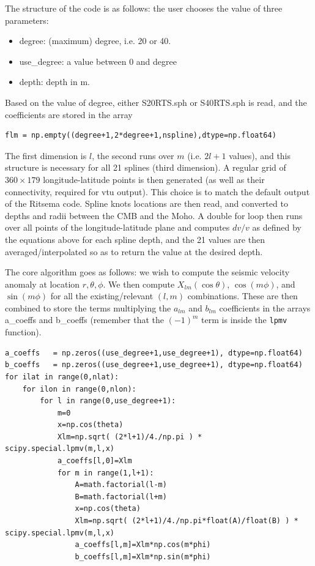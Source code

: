 The structure of the code is as follows: the user chooses the value of three parameters:
\begin{itemize}
\item {\python degree}: (maximum) degree, i.e. 20 or 40.
\item {\python use\_degree}: a value between 0 and {\python degree}
\item {\python depth}: depth in \si{m}.
\end{itemize}
Based on the value of {\python degree}, either {\filenamefont S20RTS.sph} or {\filenamefont S40RTS.sph} is read,
and the coefficients are stored in the array
\begin{verbatim}
flm = np.empty((degree+1,2*degree+1,nspline),dtype=np.float64)
\end{verbatim}
The first dimension is $l$, the second runs over $m$ (i.e. $2l+1$ values), 
and this structure is necessary for all 21 splines (third dimension).
A regular grid of $360\times 179$ longitude-latitude points is then generated (as well as their connectivity, required for vtu output). This choice is to match the default output of the Ritsema code.
Spline knots locations are then read, and converted to depths and radii between the CMB and the Moho.
A double for loop then runs over all points of the longitude-latitude plane and computes $dv/v$ as defined by the equations above 
for each spline depth, and the 21 values are then averaged/interpolated so as to return the value at the desired depth. 

The core algorithm goes as follows: we wish to compute the seismic velocity anomaly 
at location $r,\theta,\phi$.
We then compute $X_{lm}(\cos \theta)$, $\cos (m\phi)$, and $\sin (m\phi)$ 
for all the existing/relevant $(l,m)$ combinations. 
These are then combined to store the terms multiplying the $a_{lm}$ and $b_{lm}$ coefficients 
in the arrays {\python a\_coeffs} and {\python b\_coeffs}
(remember that the $(-1)^m$ term is inside the \texttt{lpmv} function).

\begin{lstlisting}
a_coeffs   = np.zeros((use_degree+1,use_degree+1), dtype=np.float64)
b_coeffs   = np.zeros((use_degree+1,use_degree+1), dtype=np.float64)
for ilat in range(0,nlat): 
    for ilon in range(0,nlon): 
        for l in range(0,use_degree+1):
            m=0
            x=np.cos(theta)
            Xlm=np.sqrt( (2*l+1)/4./np.pi ) * scipy.special.lpmv(m,l,x) 
            a_coeffs[l,0]=Xlm
            for m in range(1,l+1):
                A=math.factorial(l-m)
                B=math.factorial(l+m)
                x=np.cos(theta)
                Xlm=np.sqrt( (2*l+1)/4./np.pi*float(A)/float(B) ) * scipy.special.lpmv(m,l,x) 
                a_coeffs[l,m]=Xlm*np.cos(m*phi)
                b_coeffs[l,m]=Xlm*np.sin(m*phi)
\end{lstlisting}

